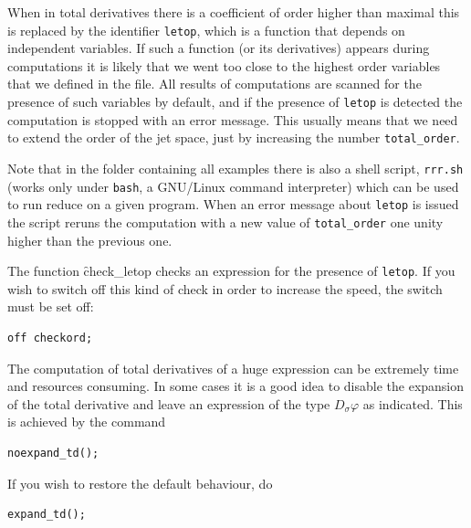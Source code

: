 When in total derivatives there is a coefficient of order higher than maximal
this is replaced by the identifier \texttt{letop}, which is a function that
depends on independent variables. If such a function (or its derivatives)
appears during computations it is likely that we went too close to the highest
order variables that we defined in the file. All results of computations are
scanned for the presence of such variables by default, and if the presence of
\texttt{letop} is detected the computation is stopped with an error
message. This usually means that we need to extend the order of the jet space,
just by increasing the number \texttt{total\_order}.

Note that in the folder containing all examples there is also a shell script,
\texttt{rrr.sh} (works only under \texttt{bash}, a GNU/Linux command
interpreter) which can be used to run reduce on a given \cde program.
When an error message about \texttt{letop} is issued the script
reruns the computation with a new value of \texttt{total\_order} one unity
higher than the previous one.

\hypertarget{switch:CHECKORD}{}
The function \f{check\_letop} checks an expression for the presence of \texttt{letop}.
If you wish to switch off this kind of check in order
to increase the speed, the switch
 must be set off:
\begin{verbatim}
off checkord;
\end{verbatim}

\hypertarget{operator:NOEXPAND_TD}{}
\hypertarget{operator:EXPAND_TD}{}
The computation of total derivatives of a huge expression can be extremely time
and resources consuming. In some cases it is a good idea to disable the
expansion of the total derivative and leave an expression of the type $D_\sigma
\varphi$ as indicated. This is achieved by the command
\begin{verbatim}
noexpand_td();
\end{verbatim}
If you wish to restore the default behaviour, do
\begin{verbatim}
expand_td();
\end{verbatim}

